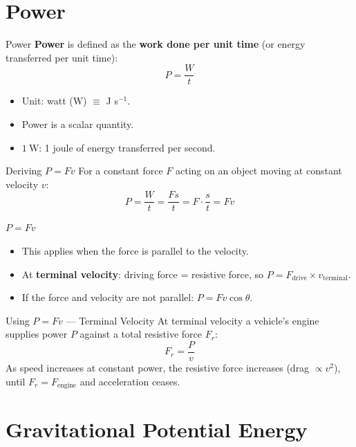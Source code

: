 \section{Power}

\begin{definitionbox}{Power}
\textbf{Power} is defined as the \textbf{work done per unit time} (or energy transferred per unit time):
$$P = \frac{W}{t}$$
\begin{itemize}[itemsep=2pt]
  \item Unit: watt (W) $\equiv$ J s$^{-1}$.
  \item Power is a scalar quantity.
  \item $1\ \text{W}$: 1 joule of energy transferred per second.
\end{itemize}
\end{definitionbox}

\begin{formulabox}{Deriving \texorpdfstring{$P = Fv$}{P = Fv}}
For a constant force $F$ acting on an object moving at constant velocity $v$:
$$P = \frac{W}{t} = \frac{Fs}{t} = F \cdot \frac{s}{t} = Fv$$
\begin{center}
\Large $P = Fv$
\end{center}
\begin{itemize}[itemsep=2pt]
  \item This applies when the force is parallel to the velocity.
  \item At \textbf{terminal velocity}: driving force = resistive force, so $P = F_{\text{drive}} \times v_{\text{terminal}}$.
  \item If the force and velocity are not parallel: $P = Fv\cos\theta$.
\end{itemize}
\end{formulabox}

\begin{keybox}{Using \texorpdfstring{$P = Fv$}{P = Fv} — Terminal Velocity}
At terminal velocity a vehicle's engine supplies power $P$ against a total resistive force $F_r$:
$$F_r = \frac{P}{v}$$
As speed increases at constant power, the resistive force increases (drag $\propto v^2$), until $F_r = F_{\text{engine}}$ and acceleration ceases.
\end{keybox}

\section{Gravitational Potential Energy}

